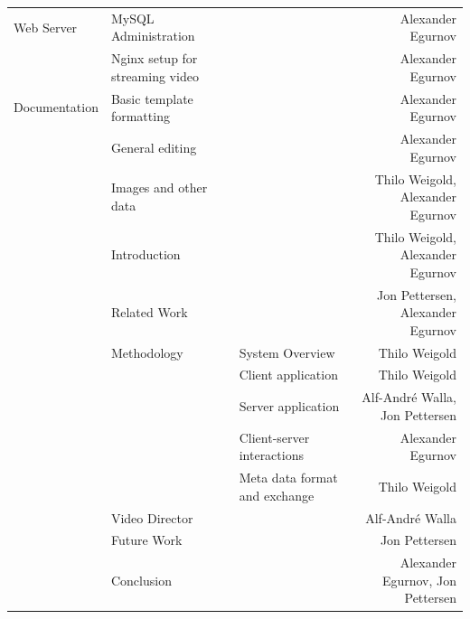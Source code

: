 \documentclass[conference]{IEEEtran}
\begin{document}
\begin{table}[t]
\begin{tabular}{lllr}
		\midrule
		Web Server
			& MySQL Administration & & Alexander Egurnov \\
			& Nginx setup for streaming video & & Alexander Egurnov \\
		\midrule
		Documentation 
			& Basic template formatting & & Alexander Egurnov \\
			& General editing & & Alexander Egurnov \\
			& Images and other data & & Thilo Weigold, Alexander Egurnov \\
			& Introduction & & Thilo Weigold, Alexander Egurnov \\
			& Related Work & & Jon Pettersen, Alexander Egurnov \\
			& Methodology & System Overview & Thilo Weigold \\
			&		& Client application & Thilo Weigold \\
			&		& Server application & Alf-André Walla, Jon Pettersen \\
			&		& Client-server interactions & Alexander Egurnov \\
			&		& Meta data format and exchange & Thilo Weigold \\
			& Video Director & & Alf-André Walla \\
			& Future Work & & Jon Pettersen \\
			& Conclusion & & Alexander Egurnov, Jon Pettersen \\
		\bottomrule
    \end{tabular}%
\end{table}%

\vfill
\end{document}
